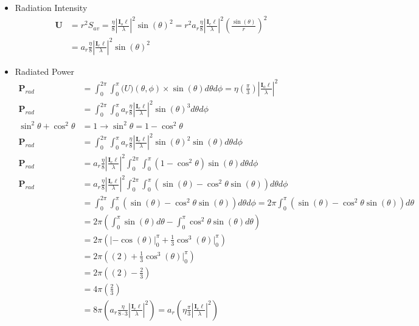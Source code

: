 \documentclass[12pt]{article}
\begin{document}
\begin{itemize}
\item Radiation Intensity
    \begin{align*}
      \mathbf{U} &= r^2S_{av} = \frac{\eta}{8}\left|\frac{\mathbf{I}_o\ell}{\lambda}\right|^2  \sin{(\theta)}^2= r^2a_r\frac{\eta}{8}\left| \frac{ \bm{I}_e\ell}{\lambda}\right|^2 \left(\frac{\sin{(\theta)}}{r}\right)^2 \\
                 &= a_r\frac{\eta}{8}\left| \frac{ \bm{I}_e\ell}{\lambda}\right|^2 \sin{(\theta)}^2
    \end{align*}
\item Radiated Power
    \begin{align*}
      \mathbf{P}_{rad} &= \int_0^{2\pi}\int_0^{\pi}\mathbf(U)(\theta,\phi)\times \sin{(\theta)}d\theta d\phi = \eta\left(\frac{\pi}{3}\right)\left|\frac{\mathbf{I}_o\ell}{\lambda}\right|^2\\
      \mathbf{P}_{rad} &= \int_0^{2\pi}\int_0^{\pi}a_r\frac{\eta}{8}\left| \frac{ \bm{I}_e\ell}{\lambda}\right|^2 \sin{(\theta)}^3d\theta d\phi \\
      \sin^2{\theta} + \cos^2{\theta} &= 1 \xrightarrow{\ \ \ \ \ } \sin^2{\theta} = 1 - \cos^2{\theta}\\
      \mathbf{P}_{rad} &= \int_0^{2\pi}\int_0^{\pi}a_r\frac{\eta}{8}\left| \frac{ \bm{I}_e\ell}{\lambda}\right|^2 \sin{(\theta)}^2\sin{(\theta)}d\theta d\phi \\
      \mathbf{P}_{rad} &= a_r\frac{\eta}{8}\left| \frac{ \bm{I}_e\ell}{\lambda}\right|^2 \int_0^{2\pi}\int_0^{\pi}(1 - \cos^2{\theta})\sin{(\theta)}d\theta d\phi \\
      \mathbf{P}_{rad} &= a_r\frac{\eta}{8}\left| \frac{ \bm{I}_e\ell}{\lambda}\right|^2 \int_0^{2\pi}\int_0^{\pi}(\sin{(\theta)} - \cos^2{\theta}\sin{(\theta)})d\theta d\phi \\
                       &= \int_0^{2\pi}\int_0^{\pi}(\sin{(\theta)} - \cos^2{\theta}\sin{(\theta)})d\theta d\phi = 2\pi \int_0^{\pi}(\sin{(\theta)} - \cos^2{\theta}\sin{(\theta)})d\theta \\
                       &= 2\pi \left(\int_0^{\pi}\sin{(\theta)}d\theta - \int_0^{\pi}\cos^2{\theta}\sin{(\theta)}d\theta\right)\\
                       &= 2\pi \left(|-\cos{(\theta)}|_0^{\pi} + \frac{1}{3}\cos^3{(\theta)}|_0^{\pi}\right)\\
                       &= 2\pi \left((2) + \frac{1}{3}\cos^3{(\theta)}|_0^{\pi}\right)\\
                       &= 2\pi \left((2) - \frac{2}{3}\right)\\
                       &= 4\pi \left(\frac{2}{3}\right)\\
                       &= 8\pi \left(a_r\frac{\eta}{8\cdot 3}\left| \frac{ \bm{I}_e\ell}{\lambda}\right|^2\right) = a_r \left(\eta\frac{\pi}{3}\left| \frac{ \bm{I}_e\ell}{\lambda}\right|^2\right) 
    \end{align*}


\end{itemize}
\end{document}
